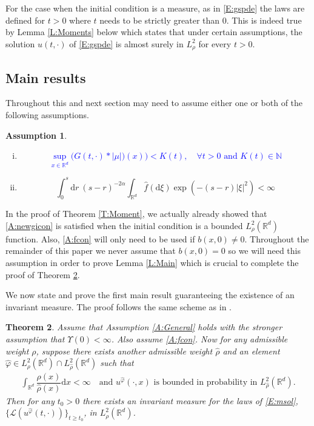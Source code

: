 \documentclass[a4paper,11pt]{article}%
\numberwithin{equation}{section}
\theoremstyle{plain}
\newtheorem{theorem}{Theorem}[section]
\theoremstyle{definition}
\newtheorem{assumptions}[theorem]{Assumption}
\newcommand{\R}{\mathbb{R}}
\newcommand{\ud}{\ensuremath{ \mathrm{d} }}
\begin{document}
For the case when the initial condition is a measure, as in \eqref{E:gspde} the laws are defined for $t>0$ where $t$ needs to be strictly greater than $0$. This is indeed true by Lemma \ref{L:Moments}  below which states that under certain assumptions, the solution $u(t,\cdot)$ of \eqref{E:gspde} is almost surely in $L^2_{\rho}$ for every $t>0$.


\subsection{Main results}
Throughout this and next section may need to assume either one or both of the following assumptions.

\begin{assumptions} $\;$
	\begin{enumerate}[(i)]

		\item \textcolor{blue}{\begin{equation}
				\sup_{x\in \R^d}	\big(G(t,\cdot)*|\mu|)(x) \big) < K(t), \quad \forall t>0 \text{ and } K(t)\in \mathbb N \label{A:newgicon}
  			   	\end{equation}
  			   }

		\item \begin{equation}
					\int_0^s \ud r \: (s-r)^{-2\alpha} \int_{\R^{d}} \hat f(\ud \xi) \exp\left(-(s-r)|\xi|^2 \right) < \infty \label{A:fcon}
				\end{equation}
	\end{enumerate}
\end{assumptions}

In the proof of Theorem \ref{T:Moment}, we actually already showed that \eqref{A:newgicon} is satisfied when the initial condition is a bounded $L^2_\rho(\R^d)$ function. Also, \eqref{A:fcon} will only need to be used if $b(x,0) \not = 0$. Throughout the remainder of this paper we never assume that $b(x,0) = 0$ so we will need this assumption in order to prove  Lemma \ref{L:Main} which is crucial to complete the proof of Theorem \ref{T:Main}.

We now state and prove the first main result guaranteeing the existence of an invariant measure. The proof follows the same scheme as in \cite{TessitoreZabczyk98M}.\\

\begin{theorem}
	\label{T:Main}
	Assume that Assumption \ref{A:General} holds with the stronger assumption that $\Upsilon(0) <\infty$. Also assume \eqref{A:fcon}. Now for any admissible weight $\rho$, suppose there exists another admissible weight $\hat\rho$ and an element $\hat{\varphi} \in L^2_\rho(\R^d) \cap L^2_{\hat\rho}(\R^d)$ such that
	\begin{align*}
		\int_{\R^d}\dfrac{\rho(x)}{\hat\rho(x)}\ud x < \infty \quad \text{and $u^{\hat\varphi}(\cdot,x)$ is bounded in probability in $L^2_{\hat\rho}(\R^d)$.}
	\end{align*}
	Then for any $t_0 >0$ there exists an invariant measure for the laws of \eqref{E:msol}, $\{\mathscr L (u^{\hat\varphi}(t,\cdot))\}_{t \ge t_0}$,  in $L^2_\rho(\R^d)$.
\end{theorem}
\end{document}
